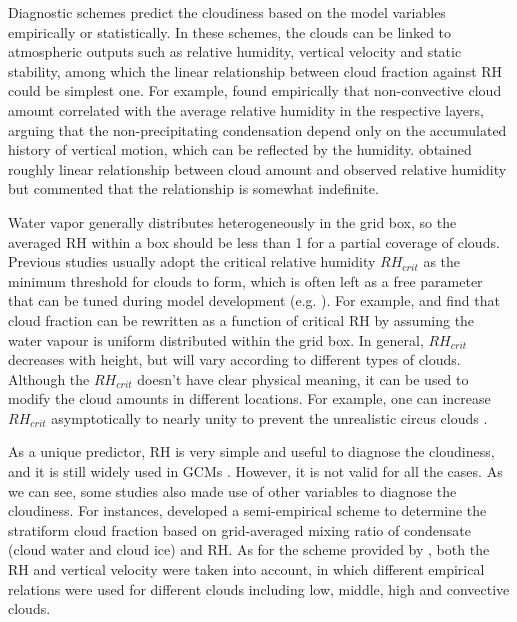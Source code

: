 Diagnostic schemes predict the cloudiness based on the model variables empirically or statistically. In these schemes, the clouds can be linked to atmospheric outputs such as relative humidity, vertical velocity and static stability, among which the linear relationship between cloud fraction against RH could be simplest one. For example, \cite{Smagorinsky1960} found empirically that non-convective cloud amount correlated with the average relative humidity in the respective layers, arguing that the non-precipitating condensation depend only on the accumulated history of vertical motion, which can be reflected by the humidity. \cite{Ricketts1973} obtained roughly linear relationship between cloud amount and observed relative humidity but commented that the relationship is somewhat indefinite. %

Water vapor generally distributes heterogeneously in the grid box, so the averaged RH within a box should be less than 1 for a partial coverage of clouds. Previous studies usually adopt the critical relative humidity $RH_{crit}$ as the minimum threshold for clouds to form, which is often left as a free parameter that can be tuned during model development (e.g. \citealp{Hourdin2017,Kay2012,Mauritsen2012}). For example, \cite{Sundqvist1978} and \cite{Sundqvist1989} find that cloud fraction can be rewritten as a function of critical RH by assuming the water vapour is uniform distributed within the grid box. In general, $RH_{crit}$ decreases with height, but will vary according to different types of clouds. Although the $RH_{crit}$ doesn't have clear physical meaning, it can be used to modify the cloud amounts in different locations. For example, one can increase $RH_{crit}$ asymptotically to nearly unity to prevent the unrealistic circus clouds \citep{Sundqvist1989}. 

As a unique predictor, RH is very simple and useful to diagnose the cloudiness, and it is still widely used in GCMs \citep[e.g.,][]{Gordon1992,Park2014,Pope2000}. However, it is not valid for all the cases. As we can see, some studies also made use of other variables to diagnose the cloudiness. For instances, \cite{Xu1996} developed a semi-empirical scheme to determine the stratiform cloud fraction based on grid-averaged mixing ratio of condensate (cloud water and cloud ice) and RH. As for the scheme provided by \cite{Slingo1987}, both the RH and vertical velocity were taken into account, in which different empirical relations were used for different clouds including low, middle, high and convective clouds.

